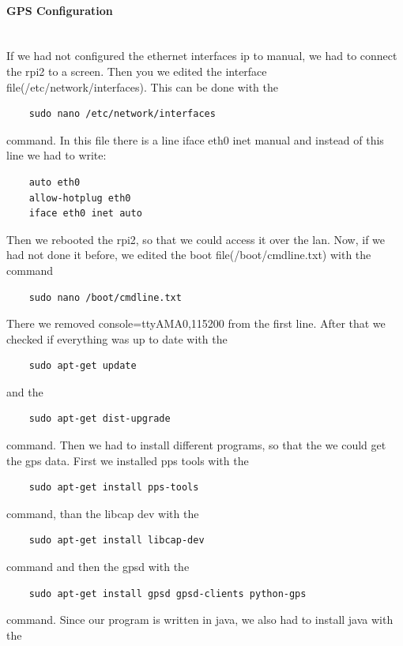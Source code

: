 \paragraph{GPS Configuration} \mbox{}\\
If we had not configured the ethernet interfaces \gls{ip} to manual, we had to connect the \gls{rpi2} to a screen. Then you we edited the interface file(/etc/network/interfaces). This can be done with the 
\begin{verbatim}
	sudo nano /etc/network/interfaces
\end{verbatim}
command. \newline
In this file there is a line iface eth0 inet manual and instead of this line we had to write:
\begin{verbatim}
	auto eth0
	allow-hotplug eth0
	iface eth0 inet auto
\end{verbatim}
Then we rebooted the \gls{rpi2}, so that we could access it over the \gls{lan}. \newline
Now, if we had not done it before, we edited the boot file(/boot/cmdline.txt) with the command 
\begin{verbatim}
	sudo nano /boot/cmdline.txt
\end{verbatim}
There we removed console=ttyAMA0,115200 from the first line.\newline
After that we checked if everything was up to date with the 
\begin{verbatim}
	sudo apt-get update
\end{verbatim}
and the 
\begin{verbatim}
	sudo apt-get dist-upgrade
\end{verbatim}
command.\newline
Then we had to install different programs, so that the we could get the \gls{gps} data.\newline
First we installed pps tools with the 
\begin{verbatim}
	sudo apt-get install pps-tools
\end{verbatim}
command, than the libcap dev with the 
\begin{verbatim}
	sudo apt-get install libcap-dev
\end{verbatim}
command and then the \gls{gpsd} with the 
\begin{verbatim}
	sudo apt-get install gpsd gpsd-clients python-gps
\end{verbatim}
command.\newline
Since our program is written in java, we also had to install java with the 
